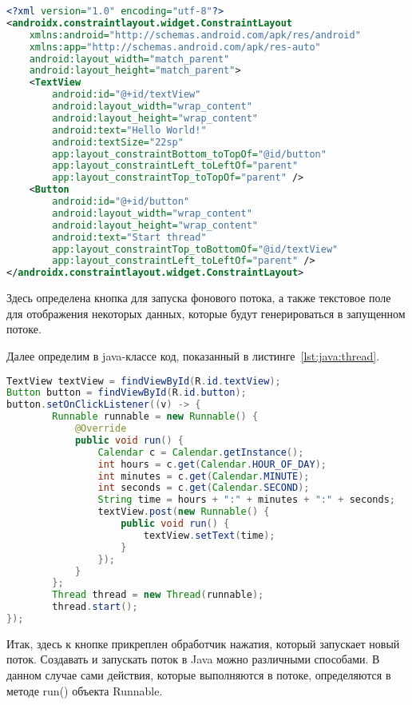 \begin{lstlisting}[language=XML
	, label=lst:xml:thread
	]
<?xml version="1.0" encoding="utf-8"?>
<androidx.constraintlayout.widget.ConstraintLayout
    xmlns:android="http://schemas.android.com/apk/res/android"
    xmlns:app="http://schemas.android.com/apk/res-auto"
    android:layout_width="match_parent"
    android:layout_height="match_parent">
    <TextView
        android:id="@+id/textView"
        android:layout_width="wrap_content"
        android:layout_height="wrap_content"
        android:text="Hello World!"
        android:textSize="22sp"
        app:layout_constraintBottom_toTopOf="@id/button"
        app:layout_constraintLeft_toLeftOf="parent"
        app:layout_constraintTop_toTopOf="parent" />
    <Button
        android:id="@+id/button"
        android:layout_width="wrap_content"
        android:layout_height="wrap_content"
        android:text="Start thread"
        app:layout_constraintTop_toBottomOf="@id/textView"
        app:layout_constraintLeft_toLeftOf="parent" />
</androidx.constraintlayout.widget.ConstraintLayout>
\end{lstlisting}

Здесь определена кнопка для запуска фонового потока, а также текстовое
поле для отображения некоторых данных, которые будут генерироваться
в запущенном потоке.\par
Далее определим в java-классе код, показанный
в листинге~\ref{lst:java:thread}.

\begin{lstlisting}[language=Java
	, label=lst:java:thread
	]
TextView textView = findViewById(R.id.textView);
Button button = findViewById(R.id.button);
button.setOnClickListener((v) -> {
		Runnable runnable = new Runnable() {
			@Override
			public void run() {
				Calendar c = Calendar.getInstance();
				int hours = c.get(Calendar.HOUR_OF_DAY);
				int minutes = c.get(Calendar.MINUTE);
				int seconds = c.get(Calendar.SECOND);
				String time = hours + ":" + minutes + ":" + seconds;
				textView.post(new Runnable() {
					public void run() {
						textView.setText(time);
					}
				});
			}
		};
		Thread thread = new Thread(runnable);
		thread.start();
});
\end{lstlisting}

Итак, здесь к кнопке прикреплен обработчик нажатия, который запускает
новый поток. Создавать и запускать поток в Java можно различными способами.
В данном случае сами действия, которые выполняются в потоке, определяются
в методе run() объекта Runnable.

